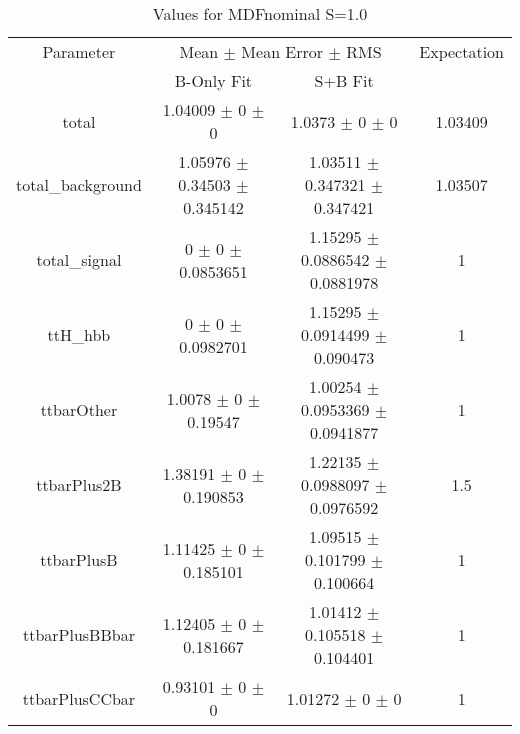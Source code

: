 \begin{table}
\centering
\caption{Values for MDFnominal S=1.0}
\begin{tabular}{cccc}
\toprule
Parameter & \multicolumn{2}{c}{Mean $\pm$ Mean Error $\pm$ RMS} & Expectation\\
 & B-Only Fit & S+B Fit & \\
\midrule
total & \num{1.04009} $\pm$ \num{0} $\pm$ \num{0} & \num{1.0373} $\pm$ \num{0} $\pm$ \num{0} & \num{1.03409}\\
total\_background & \num{1.05976} $\pm$ \num{0.34503} $\pm$ \num{0.345142} & \num{1.03511} $\pm$ \num{0.347321} $\pm$ \num{0.347421} & \num{1.03507}\\
total\_signal & \num{0} $\pm$ \num{0} $\pm$ \num{0.0853651} & \num{1.15295} $\pm$ \num{0.0886542} $\pm$ \num{0.0881978} & \num{1}\\
ttH\_hbb & \num{0} $\pm$ \num{0} $\pm$ \num{0.0982701} & \num{1.15295} $\pm$ \num{0.0914499} $\pm$ \num{0.090473} & \num{1}\\
ttbarOther & \num{1.0078} $\pm$ \num{0} $\pm$ \num{0.19547} & \num{1.00254} $\pm$ \num{0.0953369} $\pm$ \num{0.0941877} & \num{1}\\
ttbarPlus2B & \num{1.38191} $\pm$ \num{0} $\pm$ \num{0.190853} & \num{1.22135} $\pm$ \num{0.0988097} $\pm$ \num{0.0976592} & \num{1.5}\\
ttbarPlusB & \num{1.11425} $\pm$ \num{0} $\pm$ \num{0.185101} & \num{1.09515} $\pm$ \num{0.101799} $\pm$ \num{0.100664} & \num{1}\\
ttbarPlusBBbar & \num{1.12405} $\pm$ \num{0} $\pm$ \num{0.181667} & \num{1.01412} $\pm$ \num{0.105518} $\pm$ \num{0.104401} & \num{1}\\
ttbarPlusCCbar & \num{0.93101} $\pm$ \num{0} $\pm$ \num{0} & \num{1.01272} $\pm$ \num{0} $\pm$ \num{0} & \num{1}\\
\bottomrule
\end{tabular}
\end{table}